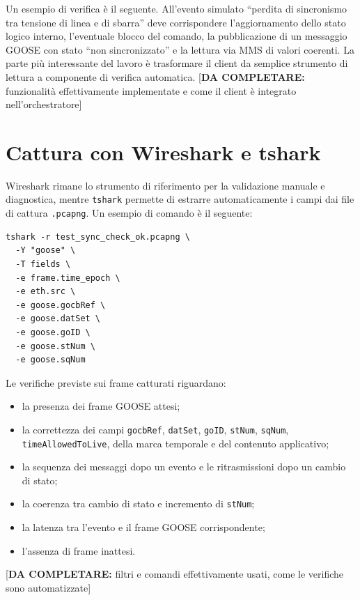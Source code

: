 \documentclass[11pt,a4paper,italian,oneside,openany]{book}
\newcommand{\daf}[1]{{\color{red}[\textbf{DA COMPLETARE:} #1]}}
\begin{document}
Un esempio di verifica è il seguente. All'evento simulato \enquote{perdita di sincronismo tra tensione di linea e di sbarra} deve corrispondere l'aggiornamento dello stato logico interno, l'eventuale blocco del comando, la pubblicazione di un messaggio GOOSE con stato \enquote{non sincronizzato} e la lettura via MMS di valori coerenti. La parte più interessante del lavoro è trasformare il client da semplice strumento di lettura a componente di verifica automatica. \daf{funzionalità effettivamente implementate e come il client è integrato nell'orchestratore}

\section{Cattura con Wireshark e tshark}
Wireshark rimane lo strumento di riferimento per la validazione manuale e diagnostica, mentre \texttt{tshark} permette di estrarre automaticamente i campi dai file di cattura \texttt{.pcapng}. Un esempio di comando è il seguente:
\begin{lstlisting}
tshark -r test_sync_check_ok.pcapng \
  -Y "goose" \
  -T fields \
  -e frame.time_epoch \
  -e eth.src \
  -e goose.gocbRef \
  -e goose.datSet \
  -e goose.goID \
  -e goose.stNum \
  -e goose.sqNum
\end{lstlisting}
Le verifiche previste sui frame catturati riguardano:
\begin{itemize}
    \item la presenza dei frame GOOSE attesi;
    \item la correttezza dei campi \texttt{gocbRef}, \texttt{datSet}, \texttt{goID}, \texttt{stNum}, \texttt{sqNum}, \texttt{timeAllowedToLive}, della marca temporale e del contenuto applicativo;
    \item la sequenza dei messaggi dopo un evento e le ritrasmissioni dopo un cambio di stato;
    \item la coerenza tra cambio di stato e incremento di \texttt{stNum};
    \item la latenza tra l'evento e il frame GOOSE corrispondente;
    \item l'assenza di frame inattesi.
\end{itemize}
\daf{filtri e comandi effettivamente usati, come le verifiche sono automatizzate}
\end{document}
